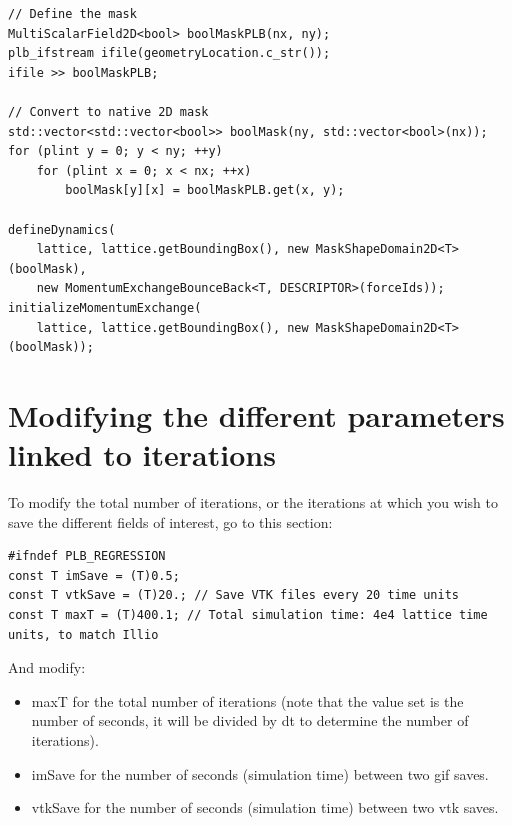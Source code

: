 \documentclass{article}
\begin{document}
\begin{verbatim}
// Define the mask 
MultiScalarField2D<bool> boolMaskPLB(nx, ny);
plb_ifstream ifile(geometryLocation.c_str());
ifile >> boolMaskPLB;

// Convert to native 2D mask
std::vector<std::vector<bool>> boolMask(ny, std::vector<bool>(nx));
for (plint y = 0; y < ny; ++y)
    for (plint x = 0; x < nx; ++x)
        boolMask[y][x] = boolMaskPLB.get(x, y);

defineDynamics(
    lattice, lattice.getBoundingBox(), new MaskShapeDomain2D<T>(boolMask),
    new MomentumExchangeBounceBack<T, DESCRIPTOR>(forceIds));
initializeMomentumExchange(
    lattice, lattice.getBoundingBox(), new MaskShapeDomain2D<T>(boolMask));
\end{verbatim}

\section{Modifying the different parameters linked to iterations}

To modify the total number of iterations, or the iterations at which you wish to save the different fields of interest, go to this section:

\begin{verbatim}
#ifndef PLB_REGRESSION
const T imSave = (T)0.5;
const T vtkSave = (T)20.; // Save VTK files every 20 time units
const T maxT = (T)400.1; // Total simulation time: 4e4 lattice time units, to match Illio
\end{verbatim}

And modify:
\begin{itemize}
    \item maxT for the total number of iterations (note that the value set is the number of seconds, it will be divided by dt to determine the number of iterations).
    \item imSave for the number of seconds (simulation time) between two gif saves.
    \item vtkSave for the number of seconds (simulation time) between two vtk saves.
\end{itemize}
\end{document}
